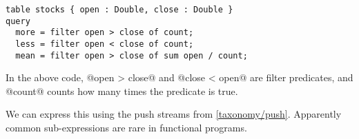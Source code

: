 % 
% 
% 
% 
% 
% 
% 


\begin{lstlisting}
table stocks { open : Double, close : Double }
query 
  more = filter open > close of count;
  less = filter open < close of count;
  mean = filter open > close of sum open / count;
\end{lstlisting}


In the above code, @open > close@ and @close < open@ are filter predicates, and @count@ counts how many times the predicate is true.

We can express this using the push streams from \autoref{taxonomy/push}.
Apparently common sub-expressions are rare in functional programs.
\cite{chitil1997common}

